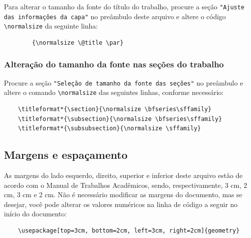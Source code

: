 \documentclass[
article,			%
12pt,				%
oneside,			%
a4paper,			%
english,			%
brazil,				%
sumario=tradicional
]{abntex2}
\begin{document}
    Para alterar o tamanho da fonte do título do trabalho, procure a seção \texttt{"Ajuste das informações da capa"} no preâmbulo deste arquivo e altere o código \verb|\normalsize| da seguinte linha:

    \begin{verbatim}
        {\normalsize \@title \par}
    \end{verbatim}

    \subsubsection{Alteração do tamanho da fonte nas seções do trabalho}

    Procure a seção \texttt{"Seleção de tamanho da fonte das seções"} no preâmbulo e altere o comando \verb|\normalsize| das seguintes linhas, conforme necessário:

    \begin{verbatim}
    \titleformat*{\section}{\normalsize \bfseries\sffamily} 
    \titleformat*{\subsection}{\normalsize \bfseries\sffamily}
    \titleformat*{\subsubsection}{\normalsize \sffamily} 
    \end{verbatim}

    \subsection{Margens e espaçamento}

    As margens do lado esquerdo, direito, superior e inferior deste arquivo estão de acordo com o Manual de Trabalhos Acadêmicos, sendo, respectivamente, 3 cm, 2 cm, 3 cm e 2 cm. Não é necessário modificar as margens do documento, mas se desejar, você pode alterar os valores numéricos na linha de código a seguir no início do documento:

    \begin{verbatim}
    \usepackage[top=3cm, bottom=2cm, left=3cm, right=2cm]{geometry}
    \end{verbatim}
\end{document}
